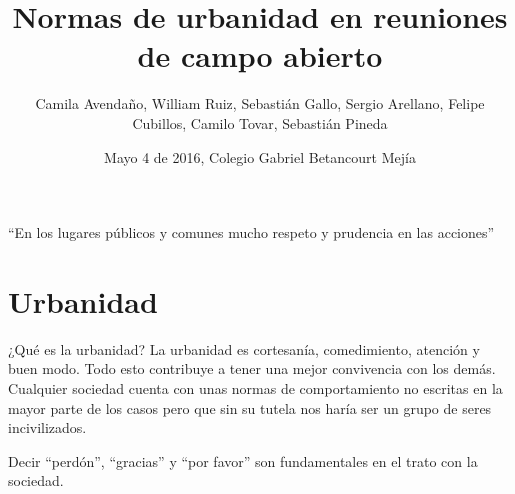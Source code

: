 \documentclass{beamer}
\title{Normas de urbanidad en reuniones de campo abierto}
\author[Camila, William, Sebastián, Sergio, Felipe, Camilo, Sebastián P.]{Camila Avendaño, William Ruiz, Sebastián Gallo, Sergio Arellano, Felipe Cubillos, Camilo Tovar, Sebastián Pineda}
\institute[Universities of Somewhere and Elsewhere] 
{
  \inst{}%
  Ética\\
  Profesor Javier Guarnizo \\
  }
\date{Mayo 4 de 2016, Colegio Gabriel Betancourt Mejía}
\begin{document}
\begin{frame}
  \titlepage
\end{frame}

\begin{frame}{``En los lugares públicos y comunes mucho respeto y prudencia en las acciones''}
  \tableofcontents
\end{frame}



 \section{Urbanidad}
 \begin{frame}{¿Qué es la urbanidad?}
 La urbanidad es cortesanía, comedimiento, atención y buen modo. Todo esto contribuye a tener una mejor convivencia con los demás. Cualquier sociedad cuenta con unas normas de comportamiento no escritas en la mayor parte de los casos pero que sin su tutela nos haría ser un grupo de seres incivilizados.
 \end{frame}
 \begin{frame}{}
Decir ``perdón'', ``gracias'' y ``por favor'' son fundamentales en el trato con la sociedad.
\end{frame}
\end{document}
